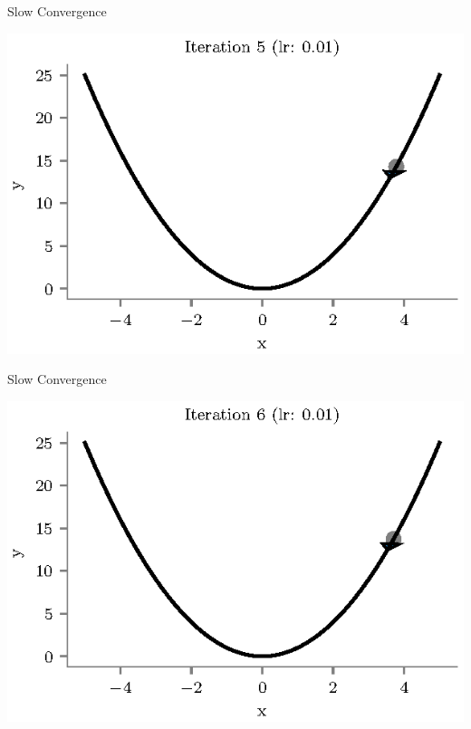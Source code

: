 \documentclass{beamer}
\begin{document}
\begin{frame}{Slow Convergence}
\begin{center}
\includegraphics[totalheight=6cm]{undershooting-5.eps}
\end{center}
\end{frame}

\begin{frame}{Slow Convergence}
\begin{center}
\includegraphics[totalheight=6cm]{undershooting-6.eps}
\end{center}
\end{frame}
\end{document}
